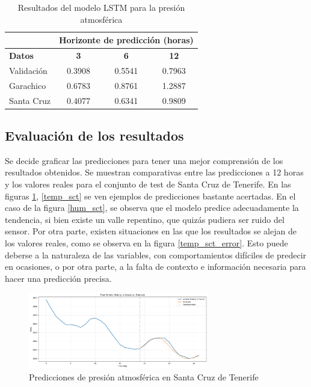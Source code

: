 \begin{table}[h!]
\centering
\begin{tabular}{|l|c|c|c|}
\hline
\multicolumn{1}{|c|}{} & \multicolumn{3}{c|}{\textbf{Horizonte de predicción (horas)}} \\
\hline
\textbf{Datos} & \textbf{3} & \textbf{6} & \textbf{12} \\
\hline
Validación   &   0.3908           &    0.5541        &   0.7963          \\
\hline
Garachico    & 0.6783             &     0.8761       &     1.2887               \\
\hline
Santa Cruz &    0.4077            &     0.6341       &    0.9809                 \\
\hline
\end{tabular}
\caption{Resultados del modelo LSTM para la presión atmosférica}
\label{pres_results}
\end{table}


\subsection{Evaluación de los resultados}
Se decide graficar las predicciones para tener una mejor comprensión de los resultados obtenidos. Se muestran comparativas entre las predicciones a 12 horas y los valores
reales para el conjunto de test de Santa Cruz de Tenerife. En las figuras \ref{pres_sct}, \ref{temp_sct} se ven ejemplos de predicciones bastante acertadas. 
En el caso de la figura \ref{hum_sct}, se observa que el modelo predice adecuadamente la tendencia, si bien existe un valle repentino, que quizás pudiera ser ruido del sensor.
Por otra parte, existen situaciones en las que los resultados se alejan de los valores reales, como se observa en la figura \ref{temp_sct_error}. Esto puede deberse
a la naturaleza de las variables, con comportamientos difíciles de predecir en ocasiones, o por otra parte, a la falta de contexto e información necesaria para hacer una predicción precisa.

\begin{figure}
    \centering
    \includegraphics[width=0.7\textwidth]{images/grafico_f12_pres.png}
    \caption{Predicciones de presión atmosférica en Santa Cruz de Tenerife}
    \label{pres_sct}
\end{figure}    

